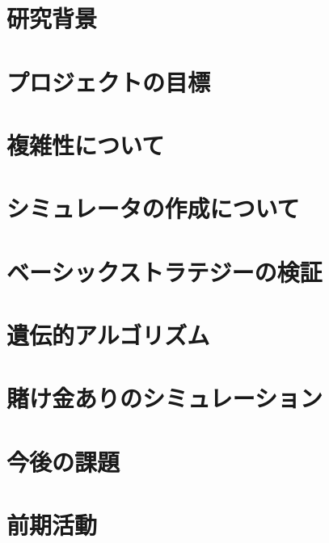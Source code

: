 \documentclass[11pt,a4paper,oneside]{jsbook}
\begin{document}
\tableofcontents
\newpage


\chapter{研究背景}






\chapter{プロジェクトの目標}

\chapter{複雑性について}


\chapter{シミュレータの作成について}


\chapter{ベーシックストラテジーの検証}




\chapter{遺伝的アルゴリズム}



\chapter{賭け金ありのシミュレーション}



\chapter{今後の課題}

\chapter{前期活動}

%
\end{document}
